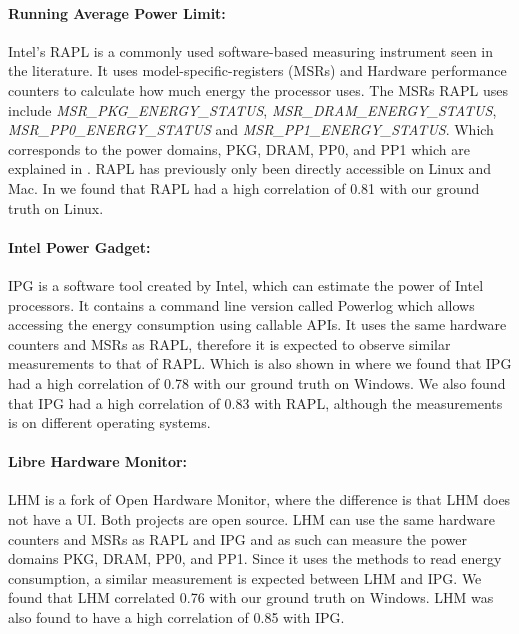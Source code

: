 \paragraph{Running Average Power Limit:}
Intel's RAPL is a commonly used software-based measuring instrument seen in the literature.\cite{biksbois} It uses model-specific-registers (MSRs) and Hardware performance counters to calculate how much energy the processor uses. The MSRs RAPL uses include \textit{MSR\_PKG\_ENERGY\_STATUS}, \textit{MSR\_DRAM\_ENERGY\_STATUS}, \textit{MSR\_PP0\_ENERGY\_STATUS} and \textit{MSR\_PP1\_ENERGY\_STATUS}. Which corresponds to the power domains, PKG, DRAM, PP0, and PP1 which are explained in \cite{biksbois}. RAPL has previously only been directly accessible on Linux and Mac. In \cite{biksbois} we found that RAPL had a high correlation of 0.81 with our ground truth on Linux.\cite{biksbois}

\paragraph{Intel Power Gadget:}
IPG is a software tool created by Intel, which can estimate the power of Intel processors. It contains a command line version called Powerlog which allows accessing the energy consumption using callable APIs. It uses the same hardware counters and MSRs as RAPL\cite{FireFox}, therefore it is expected to observe similar measurements to that of RAPL. Which is also shown in \cite{biksbois} where we found that IPG had a high correlation of 0.78 with our ground truth on Windows. We also found that IPG had a high correlation of 0.83 with RAPL, although the measurements is on different operating systems.\cite{biksbois}





\paragraph{Libre Hardware Monitor:}
LHM\cite{LHM} is a fork of Open Hardware Monitor, where the difference is that LHM does not have a UI. Both projects are open source. LHM can use the same hardware counters and MSRs as RAPL and IPG and as such can measure the power domains PKG, DRAM, PP0, and PP1. Since it uses the methods to read energy consumption, a similar measurement is expected between LHM and IPG. We found that LHM correlated 0.76 with our ground truth on Windows. LHM was also found to have a high correlation of 0.85 with IPG.\cite{biksbois}

